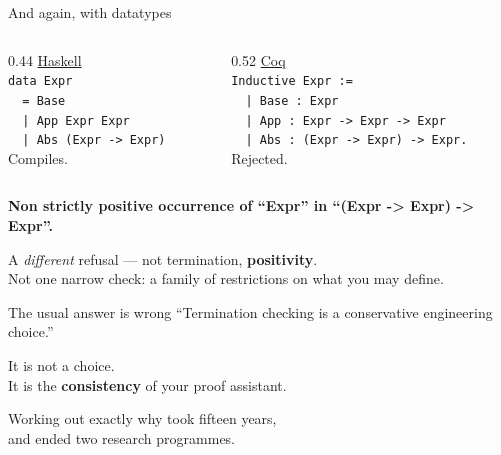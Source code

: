 \documentclass[aspectratio=169,11pt]{beamer}
\newcommand{\key}[1]{{\color{accent}\textbf{#1}}}
\newcommand{\bad}[1]{{\color{warn}\textbf{#1}}}
\begin{document}
\begin{frame}{And again, with datatypes}
  \vfill
  \begin{columns}[T]
    \begin{column}{0.44\textwidth}
      \underline{Haskell}\\[0.7em]
      {\small\texttt{data Expr}\\
      \texttt{~~= Base}\\
      \texttt{~~| App Expr Expr}\\
      \texttt{~~| Abs (Expr -> Expr)}}\\[1.2em]
      {\color{accent}\Large Compiles.}
    \end{column}
    \begin{column}{0.52\textwidth}
      \underline{Coq}\\[0.7em]
      {\small\texttt{Inductive Expr :=}\\
      \texttt{~~| Base : Expr}\\
      \texttt{~~| App : Expr -> Expr -> Expr}\\
      \texttt{~~| Abs : (Expr -> Expr) -> Expr.}}\\[1.2em]
      {\color{warn}\Large Rejected.}
    \end{column}
  \end{columns}
  \vfill
  \pause
  \begin{center}\small
    \bad{Non strictly positive occurrence of ``Expr'' in ``(Expr -> Expr) -> Expr''.}
  \end{center}
  \vfill
  \begin{center}
    A \emph{different} refusal --- not termination, \key{positivity}.\\
    {\small Not one narrow check: a family of restrictions on what you may define.}
  \end{center}
\end{frame}

\begin{frame}{The usual answer is wrong}
  \vfill
  ``Termination checking is a conservative engineering choice.''
  \vfill
  \pause
  \begin{center}
    \Large It is not a choice.\\[0.8em]
    \large It is the \key{consistency} of your proof assistant.
  \end{center}
  \vfill
  \pause
  \begin{center}
    Working out exactly why took fifteen years,\\
    and ended two research programmes.
  \end{center}
  \vfill
\end{frame}
\end{document}
